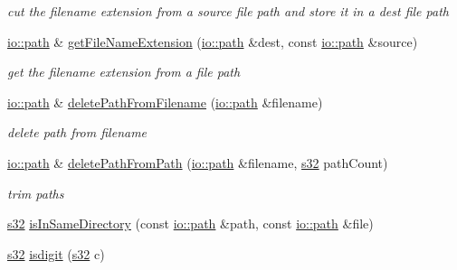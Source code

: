 \begin{DoxyCompactItemize}
\begin{DoxyCompactList}\small\item\em cut the filename extension from a source file path and store it in a dest file path \end{DoxyCompactList}\item 
\hyperlink{namespaceirr_1_1io_ab1bdc45edb3f94d8319c02bc0f840ee1}{io\+::path} \& \hyperlink{namespaceirr_1_1core_abebbe8b229dc865ebeb9bb0fd367d6ea}{get\+File\+Name\+Extension} (\hyperlink{namespaceirr_1_1io_ab1bdc45edb3f94d8319c02bc0f840ee1}{io\+::path} \&dest, const \hyperlink{namespaceirr_1_1io_ab1bdc45edb3f94d8319c02bc0f840ee1}{io\+::path} \&source)\hypertarget{namespaceirr_1_1core_abebbe8b229dc865ebeb9bb0fd367d6ea}{}\label{namespaceirr_1_1core_abebbe8b229dc865ebeb9bb0fd367d6ea}

\begin{DoxyCompactList}\small\item\em get the filename extension from a file path \end{DoxyCompactList}\item 
\hyperlink{namespaceirr_1_1io_ab1bdc45edb3f94d8319c02bc0f840ee1}{io\+::path} \& \hyperlink{namespaceirr_1_1core_a905c95bab4a7e8d5360a19b0726383a9}{delete\+Path\+From\+Filename} (\hyperlink{namespaceirr_1_1io_ab1bdc45edb3f94d8319c02bc0f840ee1}{io\+::path} \&filename)\hypertarget{namespaceirr_1_1core_a905c95bab4a7e8d5360a19b0726383a9}{}\label{namespaceirr_1_1core_a905c95bab4a7e8d5360a19b0726383a9}

\begin{DoxyCompactList}\small\item\em delete path from filename \end{DoxyCompactList}\item 
\hyperlink{namespaceirr_1_1io_ab1bdc45edb3f94d8319c02bc0f840ee1}{io\+::path} \& \hyperlink{namespaceirr_1_1core_a9215d20e34c12cb6c1522366389bfcce}{delete\+Path\+From\+Path} (\hyperlink{namespaceirr_1_1io_ab1bdc45edb3f94d8319c02bc0f840ee1}{io\+::path} \&filename, \hyperlink{namespaceirr_ac66849b7a6ed16e30ebede579f9b47c6}{s32} path\+Count)\hypertarget{namespaceirr_1_1core_a9215d20e34c12cb6c1522366389bfcce}{}\label{namespaceirr_1_1core_a9215d20e34c12cb6c1522366389bfcce}

\begin{DoxyCompactList}\small\item\em trim paths \end{DoxyCompactList}\item 
\hyperlink{namespaceirr_ac66849b7a6ed16e30ebede579f9b47c6}{s32} \hyperlink{namespaceirr_1_1core_afc9926e02ab9727cd5998ab2ffa9fa32}{is\+In\+Same\+Directory} (const \hyperlink{namespaceirr_1_1io_ab1bdc45edb3f94d8319c02bc0f840ee1}{io\+::path} \&path, const \hyperlink{namespaceirr_1_1io_ab1bdc45edb3f94d8319c02bc0f840ee1}{io\+::path} \&file)
\item 
\hyperlink{namespaceirr_ac66849b7a6ed16e30ebede579f9b47c6}{s32} \hyperlink{namespaceirr_1_1core_ac7f1fc1c7eb3f8291b8a044214823070}{isdigit} (\hyperlink{namespaceirr_ac66849b7a6ed16e30ebede579f9b47c6}{s32} c)\hypertarget{namespaceirr_1_1core_ac7f1fc1c7eb3f8291b8a044214823070}{}\label{namespaceirr_1_1core_ac7f1fc1c7eb3f8291b8a044214823070}


\end{DoxyCompactItemize}
